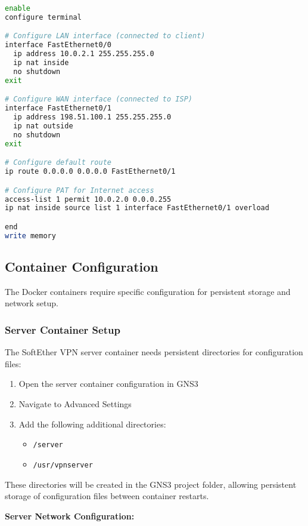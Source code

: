 \begin{lstlisting}[language=bash]
enable
configure terminal

# Configure LAN interface (connected to client)
interface FastEthernet0/0
  ip address 10.0.2.1 255.255.255.0
  ip nat inside
  no shutdown
exit

# Configure WAN interface (connected to ISP)
interface FastEthernet0/1
  ip address 198.51.100.1 255.255.255.0
  ip nat outside
  no shutdown
exit

# Configure default route
ip route 0.0.0.0 0.0.0.0 FastEthernet0/1

# Configure PAT for Internet access
access-list 1 permit 10.0.2.0 0.0.0.255
ip nat inside source list 1 interface FastEthernet0/1 overload

end
write memory
\end{lstlisting}

\subsection{Container Configuration}

The Docker containers require specific configuration for persistent storage and network setup.

\subsubsection{Server Container Setup}

The SoftEther VPN server container needs persistent directories for configuration files:

\begin{enumerate}
    \item Open the server container configuration in GNS3
    \item Navigate to Advanced Settings
    \item Add the following additional directories:
    \begin{itemize}
        \item \texttt{/server}
        \item \texttt{/usr/vpnserver}
    \end{itemize}
\end{enumerate}

These directories will be created in the GNS3 project folder, allowing persistent storage of configuration files between container restarts.

\textbf{Server Network Configuration:}

